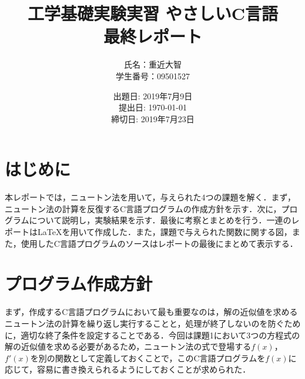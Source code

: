 \documentclass[12pt]{jarticle}
\renewcommand  \[  {\begin{eqnarray}}
\renewcommand  \]  {\end{eqnarray}}
\begin{document}
\title{工学基礎実験実習 やさしいC言語\\最終レポート}
\date{出題日: 2019年7月9日 \\
      提出日: \today \\
      締切日: 2019年7月23日 \\} 
\author{氏名：重近大智\\学生番号：09501527}
\maketitle

\section{はじめに}
本レポートでは，ニュートン法を用いて，与えられた4つの課題を解く．まず，ニュートン法の計算を反復するC言語プログラムの作成方針を示す．次に，プログラムについて説明し，実験結果を示す．最後に考察とまとめを行う．一連のレポートは\LaTeX{}を用いて作成した．また，課題で与えられた関数に関する図，また，使用したC言語プログラムのソースはレポートの最後にまとめて表示する．

\section{プログラム作成方針}
まず，作成するC言語プログラムにおいて最も重要なのは，解の近似値を求めるニュートン法の計算を繰り返し実行することと，処理が終了しないのを防ぐために，適切な終了条件を設定することである．今回は課題1において3つの方程式の解の近似値を求める必要があるため，ニュートン法の式で登場する$f(x)$，$f\prime(x)$を別の関数として定義しておくことで，このC言語プログラムを$f(x)$に応じて，容易に書き換えられるようにしておくことが求められた．
\end{document}
